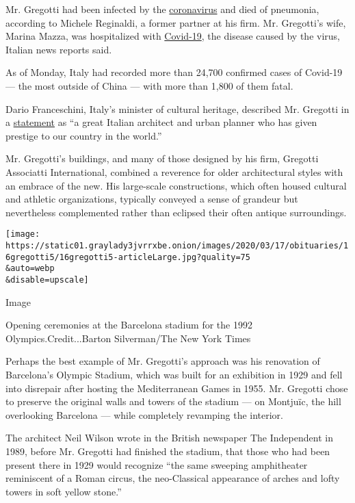 Mr. Gregotti had been infected by the
\href{https://www.nytimes3xbfgragh.onion/news-event/coronavirus}{coronavirus}
and died of pneumonia, according to Michele Reginaldi, a former partner
at his firm. Mr. Gregotti's wife, Marina Mazza, was hospitalized with
\href{https://www.fda.gov/emergency-preparedness-and-response/mcm-issues/coronavirus-disease-2019-covid-19-frequently-asked-questions}{Covid-19},
the disease caused by the virus, Italian news reports said.

As of Monday, Italy had recorded more than 24,700 confirmed cases of
Covid-19 --- the most outside of China --- with more than 1,800 of them
fatal.

Dario Franceschini, Italy's minister of cultural heritage, described Mr.
Gregotti in a
\href{https://www.beniculturali.it/mibac/export/MiBAC/sito-MiBAC/Contenuti/MibacUnif/Comunicati/visualizza_asset.html_1827386555.html}{statement}
as ``a great Italian architect and urban planner who has given prestige
to our country in the world.''

Mr. Gregotti's buildings, and many of those designed by his firm,
Gregotti Associatti International, combined a reverence for older
architectural styles with an embrace of the new. His large-scale
constructions, which often housed cultural and athletic organizations,
typically conveyed a sense of grandeur but nevertheless complemented
rather than eclipsed their often antique surroundings.

\texttt{[image: https://static01.graylady3jvrrxbe.onion/images/2020/03/17/obituaries/16gregotti5/16gregotti5-articleLarge.jpg?quality=75\\\&auto=webp\\\&disable=upscale]}

Image

Opening ceremonies at the Barcelona stadium for the 1992
Olympics.Credit...Barton Silverman/The New York Times

Perhaps the best example of Mr. Gregotti's approach was his renovation
of Barcelona's Olympic Stadium, which was built for an exhibition in
1929 and fell into disrepair after hosting the Mediterranean Games in
1955. Mr. Gregotti chose to preserve the original walls and towers of
the stadium --- on Montjuïc, the hill overlooking Barcelona --- while
completely revamping the interior.

The architect Neil Wilson wrote in the British newspaper The Independent
in 1989, before Mr. Gregotti had finished the stadium, that those who
had been present there in 1929 would recognize ``the same sweeping
amphitheater reminiscent of a Roman circus, the neo-Classical appearance
of arches and lofty towers in soft yellow stone.''

